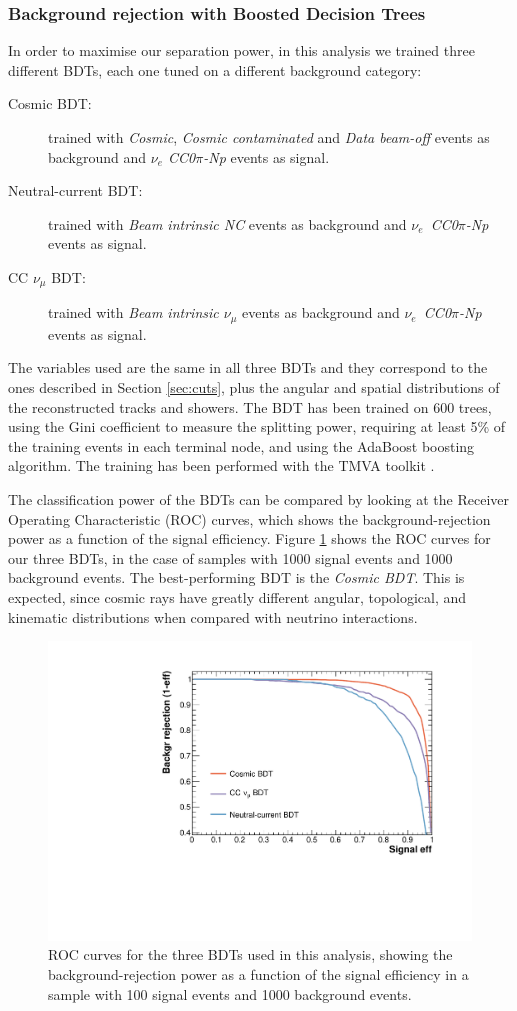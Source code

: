 \subsubsection{Background rejection with Boosted Decision Trees}
In order to maximise our separation power, in this analysis we trained three different BDTs, each one tuned on a different background category:
\begin{description}
\item[Cosmic BDT:] trained with \emph{Cosmic}, \emph{Cosmic contaminated} and \emph{Data beam-off} events as background and \emph{$\nu_e$ CC0$\pi$-Np} events as signal. 
\item[Neutral-current BDT:] trained with \emph{Beam intrinsic NC} events as background and \emph{$\nu_e$~CC0$\pi$-Np} events as signal. 
\item[CC $\nu_{\mu}$ BDT:] trained with \emph{Beam intrinsic $\nu_{\mu}$} events as background and \emph{$\nu_e$~CC0$\pi$-Np} events as signal. 
\end{description}

The variables used are the same in all three BDTs and they correspond to the ones described in Section \ref{sec:cuts}, plus the angular and spatial distributions of the reconstructed tracks and showers. The BDT has been trained on 600 trees, using the Gini coefficient to measure the splitting power, requiring at least 5\% of the training events in each terminal node, and using the AdaBoost boosting algorithm. The training has been performed with the TMVA toolkit \cite{Hocker:2007ht}. 

The classification power of the BDTs can be compared by looking at the Receiver Operating Characteristic (ROC) curves, which shows the background-rejection power as a function of the signal efficiency. Figure \ref{fig:roc} shows the ROC curves for our three BDTs, in the case of samples with 1000 signal events and 1000 background events. The best-performing BDT is the \emph{Cosmic BDT}. This is expected, since cosmic rays have greatly different angular, topological, and kinematic distributions when compared with neutrino interactions. 

\begin{figure}[htbp]
\centering
  \includegraphics[width=0.75\linewidth]{figures/roc.pdf}
  \caption{ROC curves for the three BDTs used in this analysis, showing the background-rejection power as a function of the signal efficiency in a sample with 100 signal events and 1000 background events.}\label{fig:roc}
\end{figure}


